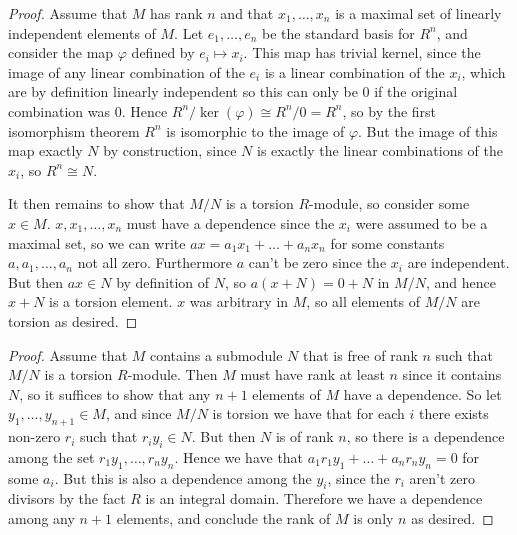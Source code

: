 \documentclass[11pt]{article}
\begin{document}
\begin{proof}
  Assume that $M$ has rank $n$ and that $x_1, \dots, x_n$ is a maximal set of linearly independent elements of $M$.
  Let $e_1, \dots, e_n$ be the standard basis for $R^n$, and consider the map $\varphi$ defined by $e_i \mapsto x_i$.
  This map has trivial kernel, since the image of any linear combination of the $e_i$ is a linear combination of the $x_i$, which are by definition linearly independent so this can only be $0$ if the original combination was $0$.
  Hence $R^n/\ker(\varphi) \cong R^n/0 = R^n$, so by the first isomorphism theorem $R^n$ is isomorphic to the image of $\varphi$.
  But the image of this map exactly $N$ by construction, since $N$ is exactly the linear combinations of the $x_i$, so $R^n \cong N$.

  It then remains to show that $M/N$ is a torsion $R$-module, so consider some $x \in M$.
  $x,x_1,\dots,x_n$ must have a dependence since the $x_i$ were assumed to be a maximal set, so we can write $ax = a_1x_1 + \dots + a_nx_n$ for some constants $a,a_1,\dots,a_n$ not all zero.
  Furthermore $a$ can't be zero since the $x_i$ are independent.
  But then $ax \in N$ by definition of $N$, so $a(x + N) = 0 + N$ in $M/N$, and hence $x+N$ is a torsion element.
  $x$ was arbitrary in $M$, so all elements of $M/N$ are torsion as desired.
\end{proof}

\begin{proof}
  Assume that $M$ contains a submodule $N$ that is free of rank $n$ such that $M/N$ is a torsion $R$-module.
  Then $M$ must have rank at least $n$ since it contains $N$, so it suffices to show that any $n+1$ elements of $M$ have a dependence.
  So let $y_1,\dots,y_{n+1} \in M$, and since $M/N$ is torsion we have that for each $i$ there exists non-zero $r_i$ such that $r_iy_i \in N$.
  But then $N$ is of rank $n$, so there is a dependence among the set $r_1y_1,\dots,r_ny_n$.
  Hence we have that $a_1r_1y_1 + \dots + a_nr_ny_n = 0$ for some $a_i$.
  But this is also a dependence among the $y_i$, since the $r_i$ aren't zero divisors by the fact $R$ is an integral domain.
  Therefore we have a dependence among any $n+1$ elements, and conclude the rank of $M$ is only $n$ as desired.
\end{proof}
\end{document}

